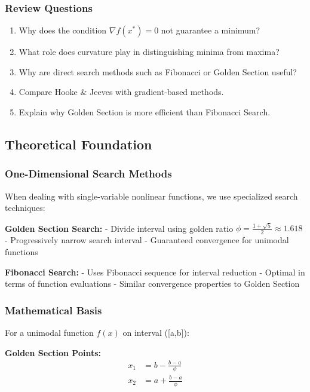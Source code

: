 \documentclass[
  letterpaper,
  DIV=11,
  numbers=noendperiod]{scrreprt}
\providecommand{\tightlist}{%
  \setlength{\itemsep}{0pt}\setlength{\parskip}{0pt}}
\begin{document}
\subsubsection{Review Questions}\label{review-questions-2}

\begin{enumerate}
\def\labelenumi{\arabic{enumi}.}
\tightlist
\item
  Why does the condition \(\nabla f(x^{*}) = 0\) not guarantee a
  minimum?
\item
  What role does curvature play in distinguishing minima from maxima?
\item
  Why are direct search methods such as Fibonacci or Golden Section
  useful?
\item
  Compare Hooke \& Jeeves with gradient-based methods.
\item
  Explain why Golden Section is more efficient than Fibonacci Search.
\end{enumerate}

\subsection{Theoretical Foundation}\label{theoretical-foundation-1}

\subsubsection{One-Dimensional Search
Methods}\label{one-dimensional-search-methods}

When dealing with single-variable nonlinear functions, we use
specialized search techniques:

\textbf{Golden Section Search:} - Divide interval using golden ratio
\(\phi = \frac{1+\sqrt{5}}{2} \approx 1.618\) - Progressively narrow
search interval - Guaranteed convergence for unimodal functions

\textbf{Fibonacci Search:} - Uses Fibonacci sequence for interval
reduction - Optimal in terms of function evaluations - Similar
convergence properties to Golden Section

\subsubsection{Mathematical Basis}\label{mathematical-basis}

For a unimodal function \(f(x)\) on interval ({[}a,b{]}):

\textbf{Golden Section Points:} \[
\begin{aligned}
x_1 & = b - \frac{b-a}{\phi} \\
x_2 & = a + \frac{b-a}{\phi}
\end{aligned}
\]
\end{document}
